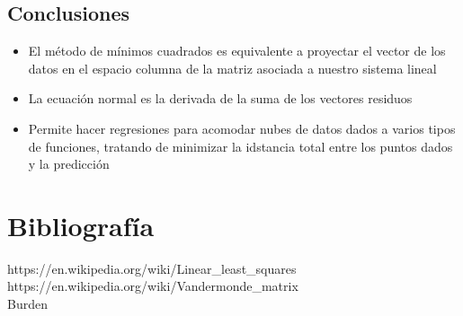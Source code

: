 \documentclass[12pt]{article}
\begin{document}
\begin{center}
    \section{Conclusiones} 
\end{center}
\begin{itemize}
\item El m\'etodo de m\'inimos cuadrados es equivalente a proyectar el vector de los datos en el espacio columna de la matriz asociada a nuestro sistema lineal

\item La ecuaci\'on normal es la derivada de la suma de los vectores residuos

\item Permite hacer regresiones para acomodar nubes de datos dados a varios tipos de funciones, tratando de minimizar la idstancia total entre los puntos dados y la predicción
    
\end{itemize}

\section*{Bibliografía}
https://en.wikipedia.org/wiki/Linear\_least\_squares \\
https://en.wikipedia.org/wiki/Vandermonde\_matrix\\
Burden
\end{document}

